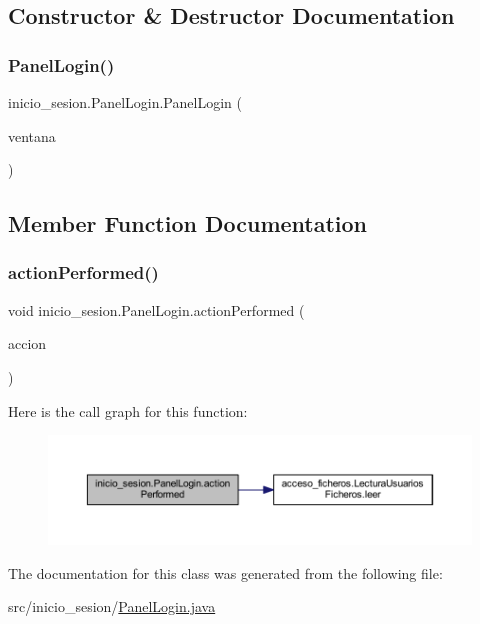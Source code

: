 \subsection{Constructor \& Destructor Documentation}
\mbox{\label{classinicio__sesion_1_1_panel_login_a8e69cf4d5de3ffa8d3c2207bb928c9ff}} 
\subsubsection{\texorpdfstring{Panel\+Login()}{PanelLogin()}}
{\footnotesize\ttfamily inicio\+\_\+sesion.\+Panel\+Login.\+Panel\+Login (\begin{DoxyParamCaption}\item[{J\+Frame}]{ventana }\end{DoxyParamCaption})}



\subsection{Member Function Documentation}
\mbox{\label{classinicio__sesion_1_1_panel_login_af8ed1b52e53779554e00710147e8928b}} 
\subsubsection{\texorpdfstring{action\+Performed()}{actionPerformed()}}
{\footnotesize\ttfamily void inicio\+\_\+sesion.\+Panel\+Login.\+action\+Performed (\begin{DoxyParamCaption}\item[{Action\+Event}]{accion }\end{DoxyParamCaption})}

Here is the call graph for this function\+:
\nopagebreak
\begin{figure}[H]
\begin{center}
\leavevmode
\includegraphics[width=350pt]{classinicio__sesion_1_1_panel_login_af8ed1b52e53779554e00710147e8928b_cgraph}
\end{center}
\end{figure}


The documentation for this class was generated from the following file\+:\begin{DoxyCompactItemize}
\item 
src/inicio\+\_\+sesion/\mbox{\hyperlink{_panel_login_8java}{Panel\+Login.\+java}}\end{DoxyCompactItemize}
